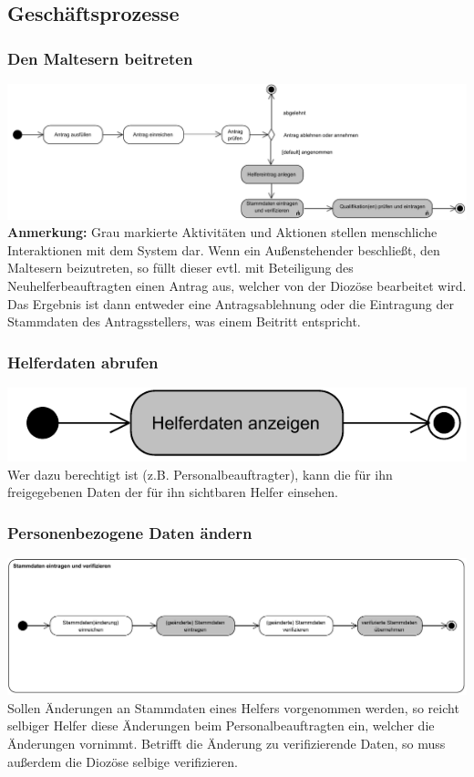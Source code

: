 \documentclass{beamer}
\begin{document}
\subsection{Geschäftsprozesse}		
\begin{frame}
\frametitle{Den Maltesern beitreten}
\includegraphics[width=\textwidth]{PDF/BusinessP/Mitglied_werden.pdf}
\textbf{Anmerkung: } Grau markierte Aktivitäten und Aktionen stellen menschliche Interaktionen mit dem System dar.
Wenn ein Außenstehender beschließt, den Maltesern beizutreten, so füllt dieser evtl. mit Beteiligung des Neuhelferbeauftragten einen Antrag aus, welcher von der Diozöse bearbeitet wird. Das Ergebnis ist dann entweder eine Antragsablehnung oder die Eintragung der Stammdaten des Antragsstellers, was einem Beitritt entspricht. 
\end{frame}
\begin{frame}
\frametitle{Helferdaten abrufen}
\includegraphics[width=\textwidth]{PDF/BusinessP/Daten_abrufen.pdf}
Wer dazu berechtigt ist (z.B. Personalbeauftragter), kann die für ihn freigegebenen Daten der für ihn sichtbaren Helfer einsehen.
\end{frame}

\begin{frame}
\frametitle{Personenbezogene Daten ändern}
\includegraphics[width=\textwidth]{PDF/BusinessP/Daten_aendern.pdf}
Sollen Änderungen an Stammdaten eines Helfers vorgenommen werden, so reicht selbiger Helfer diese Änderungen beim Personalbeauftragten ein, welcher die Änderungen vornimmt. Betrifft die Änderung zu verifizierende Daten, so muss außerdem die Diozöse selbige verifizieren.
\end{frame}
\end{document}
